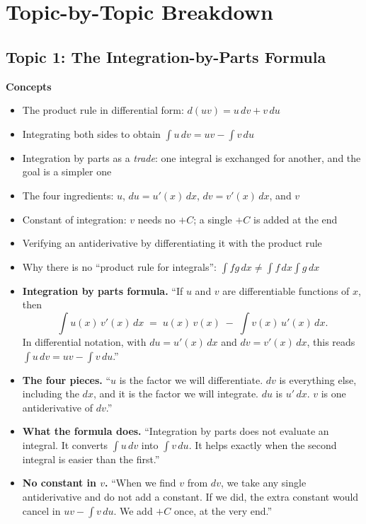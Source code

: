 \documentclass[11pt]{article}
\begin{document}
\section{Topic-by-Topic Breakdown}

\subsection{Topic 1: The Integration-by-Parts Formula}

\textbf{Concepts}
\begin{itemize}
\item The product rule in differential form: $d(uv) = u\,dv + v\,du$
\item Integrating both sides to obtain $\int u\,dv = uv - \int v\,du$
\item Integration by parts as a \emph{trade}: one integral is exchanged for another, and the goal is a simpler one
\item The four ingredients: $u$, $du = u'(x)\,dx$, $dv = v'(x)\,dx$, and $v$
\item Constant of integration: $v$ needs no $+C$; a single $+C$ is added at the end
\item Verifying an antiderivative by differentiating it with the product rule
\item Why there is no ``product rule for integrals'': $\int fg\,dx \neq \int f\,dx \int g\,dx$
\end{itemize}

\begin{defbox}
\begin{itemize}
\item \textbf{Integration by parts formula.} ``If $u$ and $v$ are differentiable functions of $x$, then
\[ \int u(x)\,v'(x)\,dx \;=\; u(x)\,v(x) \;-\; \int v(x)\,u'(x)\,dx. \]
In differential notation, with $du = u'(x)\,dx$ and $dv = v'(x)\,dx$, this reads $\int u\,dv = uv - \int v\,du$.''
\item \textbf{The four pieces.} ``$u$ is the factor we will differentiate. $dv$ is everything else, including the $dx$, and it is the factor we will integrate. $du$ is $u'\,dx$. $v$ is one antiderivative of $dv$.''
\item \textbf{What the formula does.} ``Integration by parts does not evaluate an integral. It converts $\int u\,dv$ into $\int v\,du$. It helps exactly when the second integral is easier than the first.''
\item \textbf{No constant in $v$.} ``When we find $v$ from $dv$, we take any single antiderivative and do not add a constant. If we did, the extra constant would cancel in $uv - \int v\,du$. We add $+C$ once, at the very end.''
\end{itemize}
\end{defbox}
\end{document}
